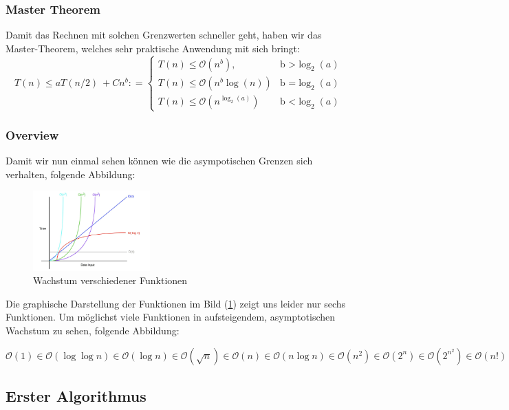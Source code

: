 \documentclass[a4paper]{article}
\begin{document}
    \subsubsection{Master Theorem}
    Damit das Rechnen mit solchen Grenzwerten schneller geht, haben wir das Master-Theorem, welches sehr praktische Anwendung mit sich bringt:
      \begin{equation} \label{MasterTheorem}
  T(n) \leq aT(n/2)\ + Cn^b: =\begin{cases}      T(n) \leq \mathcal{O}(n^b), & \text{b >} \log_2(a)\\
      T(n) \leq \mathcal{O}(n^b\log(n)) &\text{b =} \log_2(a)\\
      T(n) \leq \mathcal{O}(n^{\log_2(a)}) & \text{b <} \log_2(a)
    \end{cases}         
  \end{equation}

    \subsubsection{Overview}
    Damit wir nun einmal sehen können wie die asympotischen Grenzen sich verhalten, folgende Abbildung: 
    \begin{figure}[h]
        \centering
        \includegraphics[width=0.4\textwidth]{Pictures/big-o-notation.jpg}
        \caption{Wachstum verschiedener Funktionen}
        \label{fig: WachstumBigO}
    \end{figure}
    Die graphische Darstellung der Funktionen im Bild (\ref{fig: WachstumBigO}) zeigt uns leider nur sechs Funktionen. 
    Um möglichst viele Funktionen in aufsteigendem, asymptotischen Wachstum zu sehen, folgende Abbildung:

    $\mathcal{O}(1) \in  \mathcal{O}(\log \log n)\in \mathcal{O}(\log n) \in \mathcal{O}(\sqrt{n}) \in \mathcal{O}(n) \in \mathcal{O}(n\log n) \in \mathcal{O}(n^2) \in \mathcal{O}(2^n) \in \mathcal{O}(2^{n^{2}}) \in \mathcal{O}(n!) $
\newpage
\subsection{Erster Algorithmus}
\end{document}
